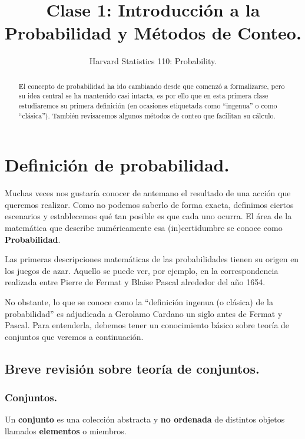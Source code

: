 \documentclass[12pt]{article}
\title{Clase 1: Introducción a la Probabilidad y Métodos de Conteo.}
\author{Harvard Statistics 110: Probability.}
\date{}
\begin{document}
\maketitle

\begin{abstract}
\noindent El concepto de probabilidad ha ido cambiando desde que comenzó a formalizarse, pero su idea central se ha mantenido casi intacta, es por ello que en esta primera clase estudiaremos su primera definición (en ocasiones etiquetada como ``ingenua'' o como ``clásica''). También revisaremos algunos métodos de conteo que facilitan su cálculo.
\end{abstract}


\section{Definición de probabilidad.}

Muchas veces nos gustaría conocer de antemano el resultado de una acción que queremos realizar. Como no podemos saberlo de forma exacta, definimos ciertos escenarios y establecemos qué tan posible es que cada uno ocurra. El área de la matemática que describe numéricamente esa (in)certidumbre se conoce como \textbf{Probabilidad}.

Las primeras descripciones matemáticas de las probabilidades tienen su origen en los juegos de azar. Aquello se puede ver, por ejemplo, en la correspondencia realizada entre Pierre de Fermat y Blaise Pascal alrededor del año 1654.

No obstante, lo que se conoce como la ``definición ingenua (o clásica) de la probabilidad'' es adjudicada a Gerolamo Cardano un siglo antes de Fermat y Pascal. Para entenderla, debemos tener un conocimiento básico sobre teoría de conjuntos que veremos a continuación.

\subsection{Breve revisión sobre teoría de conjuntos.}

\subsubsection{Conjuntos.}

Un \textbf{conjunto} es una colección abstracta y \textbf{no ordenada} de distintos objetos llamados \textbf{elementos} o miembros.
\end{document}
